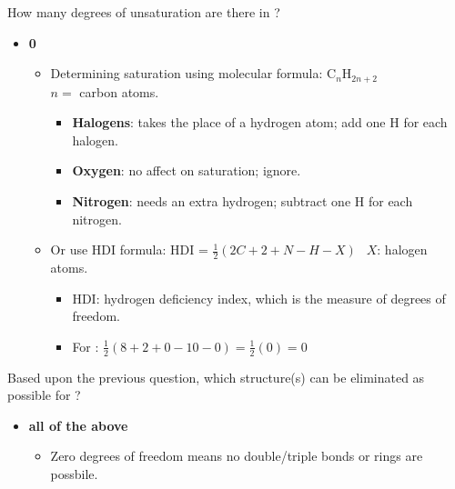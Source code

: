 \documentclass[12pt,a4paper]{article}
\begin{document}
\begin{enumerate}
\begin{itemize}
\begin{itemize}
                \end{itemize}
        \end{itemize}
    {\color{G-Moon}\item How many degrees of unsaturation are there in ?}
        \begin{itemize}
            \item {\color{o-Sun}\textbf{0}}
                \begin{itemize}
                    \item Determining saturation using molecular formula: {\color{o-Sun}C\(_{n}\)H\(_{2n+2}\)}\\\(n=\) carbon atoms.
                        \begin{itemize}
                            \item \textbf{Halogens}: takes the place of a hydrogen atom; {\color{o-Sun}add one H} for each halogen.
                            \item \textbf{Oxygen}: no affect on saturation; {\color{o-Sun}ignore}.
                            \item \textbf{Nitrogen}: needs an extra hydrogen; {\color{o-Sun}subtract one H} for each nitrogen. 
                        \end{itemize}
                    \item Or use HDI formula: {\color{o-Sun}HDI = \(\frac{1}{2}(2C + 2 + N - H - X)~~\)} \(X\): halogen atoms.
                        \begin{itemize}
                            \item HDI: hydrogen deficiency index, which is the measure of degrees of freedom.
                            \item For :  \(\frac{1}{2}(8 + 2 + 0 - 10 - 0) = \frac{1}{2}(0) = 0\) 
                        \end{itemize}
                \end{itemize}
        \end{itemize}
    \newpage
    {\color{G-Moon}\item Based upon the previous question, which structure(s) can be eliminated as possible for ?}
        \begin{itemize}
            \item {\color{o-Sun}\textbf{all of the above}}
                \begin{itemize}
                    \item {\color{o-Sun}Zero degrees of freedom} means {\color{false}no double/triple bonds or rings} are possbile.

\end{itemize}
\end{itemize}
\end{enumerate}
\end{document}

